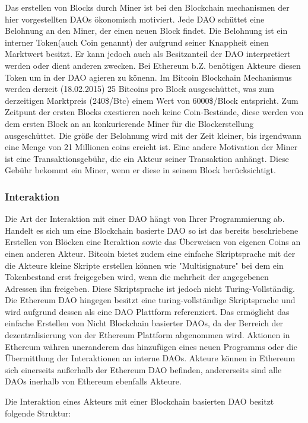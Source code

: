 \documentclass[a4paper,12pt]{report}
\begin{document}
Das erstellen von Blocks durch Miner ist bei den Blockchain mechanismen der hier vorgestellten DAOs ökonomisch motiviert. Jede DAO schüttet eine Belohnung an den Miner, der einen neuen Block findet. Die Belohnung ist ein interner Token(auch Coin genannt) der aufgrund seiner Knappheit einen Marktwert besitzt. Er kann jedoch auch als Besitzanteil der DAO interpretiert werden oder dient anderen zwecken. Bei Ethereum b.Z. benötigen Akteure diesen Token um in der DAO agieren zu könenn. Im Bitcoin Blockchain Mechanismus werden derzeit (18.02.2015) 25 Bitcoins pro Block ausgeschüttet, was zum derzeitigen Marktpreis (240\$/Btc) einem Wert von 6000\$/Block entspricht.  
Zum Zeitpunt der ersten Blocks exestieren noch keine Coin-Bestände, diese werden von dem ersten Block an an konkurierende Miner für die Blockerstellung ausgeschüttet. Die größe der Belohnung wird mit der Zeit kleiner, bis irgendwann eine Menge von 21 Millionen coins ereicht ist. Eine andere Motivation der Miner ist eine Transaktionsgebühr, die ein Akteur seiner Transaktion anhängt. Diese Gebühr bekommt ein Miner, wenn er diese in seinem Block berücksichtigt.

\subsubsection*{Interaktion}
\label{interaction}
Die Art der Interaktion mit einer DAO hängt von Ihrer Programmierung ab. Handelt es sich um eine Blockchain basierte DAO so ist das bereits beschriebene Erstellen von Blöcken eine Iteraktion sowie das Überweisen von eigenen Coins an einen anderen Akteur. Bitcoin bietet zudem eine einfache Skriptsprache mit der die Akteure kleine Skripte erstellen können wie "Multisignature" bei dem ein Tokenbestand erst freigegeben wird, wenn die mehrheit der angegebenen Adressen ihn freigeben. Diese Skriptsprache ist jedoch nicht Turing-Vollständig. Die Ethereum DAO hingegen besitzt eine turing-vollständige Skriptsprache und wird aufgrund dessen als eine DAO Plattform referenziert. Das ermöglicht das einfache Erstellen von Nicht Blockchain basierter DAOs, da der Berreich der dezentralisierung von der Ethereum Plattform abgenommen wird. Aktionen in Ethereum währen uneranderem das hinzufügen eines neuen Programms oder die Übermittlung der Interaktionen an interne DAOs. Akteure können in Ethereum sich einerseits außerhalb der Ethereum DAO befinden, andererseits sind alle DAOs inerhalb von Ethereum ebenfalls Akteure.

Die Interaktion eines Akteurs mit einer Blockchain basierten DAO besitzt folgende Struktur:
\end{document}
